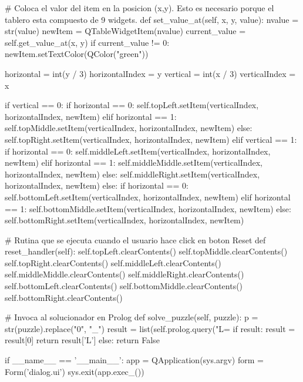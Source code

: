 \documentclass[10pt,a4paper]{article}
\begin{document}
\begin{python}
    # Coloca el valor del item en la posicion (x,y). Esto es necesario porque el tablero esta compuesto de 9 widgets.
    def set_value_at(self, x, y, value):
        nvalue = str(value)
        newItem = QTableWidgetItem(nvalue)
        current_value = self.get_value_at(x, y)
        if current_value != 0:
            newItem.setTextColor(QColor("green"))

        horizontal = int(y / 3)
        horizontalIndex = y %
        vertical = int(x / 3)
        verticalIndex = x %

        if vertical == 0:
            if horizontal == 0:
                self.topLeft.setItem(verticalIndex, horizontalIndex, newItem)
            elif horizontal == 1:
                self.topMiddle.setItem(verticalIndex, horizontalIndex, newItem)
            else:
                self.topRight.setItem(verticalIndex, horizontalIndex, newItem)
        elif vertical == 1:
            if horizontal == 0:
                self.middleLeft.setItem(verticalIndex, horizontalIndex, newItem)
            elif horizontal == 1:
                self.middleMiddle.setItem(verticalIndex, horizontalIndex, newItem)
            else:
                self.middleRight.setItem(verticalIndex, horizontalIndex, newItem)
        else:
            if horizontal == 0:
                self.bottomLeft.setItem(verticalIndex, horizontalIndex, newItem)
            elif horizontal == 1:
                self.bottomMiddle.setItem(verticalIndex, horizontalIndex, newItem)
            else:
                self.bottomRight.setItem(verticalIndex, horizontalIndex, newItem)

    # Rutina que se ejecuta cuando el usuario hace click en boton Reset
    def reset_handler(self):
        self.topLeft.clearContents()
        self.topMiddle.clearContents()
        self.topRight.clearContents()
        self.middleLeft.clearContents()
        self.middleMiddle.clearContents()
        self.middleRight.clearContents()
        self.bottomLeft.clearContents()
        self.bottomMiddle.clearContents()
        self.bottomRight.clearContents()

    # Invoca al solucionador en Prolog
    def solve_puzzle(self, puzzle):
        p = str(puzzle).replace("0", "_")
        result = list(self.prolog.query("L=%
        if result:
            result = result[0]
            return result['L']
        else:
            return False


if __name__ == '__main__':
    app = QApplication(sys.argv)
    form = Form('dialog.ui')
    sys.exit(app.exec_())
\end{python}
\end{document}
